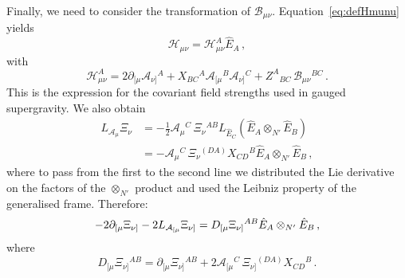 \documentclass[debug]{phd}
\begin{document}
					Finally, we need to consider the transformation of $\mathcal{B}_{\mu\nu}$.
					Equation~\eqref{eq:defHmunu} yields
							\begin{equation}
								\mathcal{H}_{\mu\nu} = \mathcal{H}_{\mu\nu}^A \hat{E}_A \,,
							\end{equation}
					with
							\begin{equation}\label{eq:defHmunu_comp}
								\mathcal{H}_{\mu\nu}^{A} = 2 \partial_{[\mu} \mathcal{A}_{\nu]}{}^A + X_{BC}{}^A \mathcal{A}_{[\mu}{}^B\mathcal{A}_{\nu]}{}^C + Z^{A}{}_{BC} \, \mathcal{B}_{\mu\nu}{}^{BC}\,.
							\end{equation}
					This is the expression for the covariant field strengths used in gauged supergravity.
					We also obtain
							\begin{equation}
								\begin{split}
									L_{\mathcal{A}_\mu} \Xi_\nu &= -\tfrac{1}{2}\mathcal{A}_\mu{}^C\, \Xi_\nu{}^{AB} L_{\hat{E}_C}( \hat{E}_A\otimes_{N'}\!\hat{E}_B) \\
														&= - \mathcal{A}_\mu{}^C \,\Xi_\nu{}^{(DA)} X_{CD}{}^B \hat{E}_A\otimes_{N'}\!\hat{E}_B\, ,
								\end{split}
							\end{equation}
					where to pass from the first to the second line we distributed the Lie derivative on the factors of the $\otimes_{N'}$ product and used the Leibniz property of the generalised frame. Therefore:
							\begin{equation}
								-2\partial_{[\mu} \Xi_{\nu]} - 2 L_{\mathcal A_{[\mu}} \Xi_{\nu]} = D_{[\mu} \Xi_{\nu]}{}^{AB} \hat{E}_A \otimes_{N'} \hat{E}_B\,,
							\end{equation}
					where
							\begin{equation}
								D_{[\mu} \Xi_{\nu]}{}^{AB} = \partial_{[\mu} \Xi_{\nu]}{}^{AB} + 2\mathcal{A}_{[\mu}{}^C \,\Xi_{\nu]}{}^{(DA)} X_{CD}{}^B \,.
							\end{equation}
\end{document}
